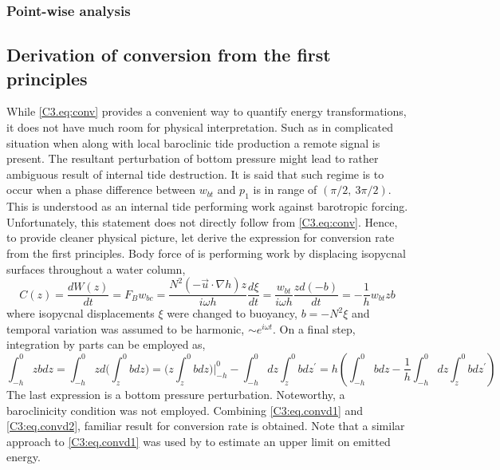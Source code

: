 \documentclass[12pt]{article}
\begin{document}
\subsubsection{Point-wise analysis}
\label{C3.app:A2}

\subsection{Derivation of conversion from the first principles}
\label{C3.app:B}
While \eqref{C3.eq:conv} provides a convenient way to quantify energy transformations, it does 
not have much room for physical interpretation. Such as in complicated situation when along with 
local baroclinic tide production a remote signal is present. The resultant perturbation of bottom 
pressure might lead to rather ambiguous result of internal tide destruction. It is said that such 
regime is to occur when a phase difference between $w_{bt}$ and $p_{1}$ is in range of 
$(\pi/2,~3\pi/2)$. This is understood as an internal tide performing work against barotropic 
forcing. Unfortunately, this statement does not directly follow from \eqref{C3.eq:conv}. Hence, to 
provide cleaner physical picture, let derive the expression for conversion rate from the first 
principles. Body force of \citep{baines1982internal} is performing work by displacing isopycnal 
surfaces 
throughout a water column,
\begin{equation}
\label{C3:eq.convd1}
C(z) = \frac{dW(z)}{dt} = F_{B} w_{bc} = \frac{N^2 (-\vec{u} \cdot \nabla h) z}{i \omega h} 
\frac{d 
\xi}{dt} = \frac{w_{bt}}{i \omega h} \frac{z d(-b)}{dt} = -\frac{1}{h} w_{bt} zb
\end{equation}
where isopycnal displacements $\xi$ were changed to buoyancy, $b = -N^2 \xi$ and temporal 
variation 
was assumed to be harmonic, $\sim e^{i \omega t}$. On a final step, integration by parts can be 
employed as,
\begin{equation}
\label{C3:eq.convd2}
\int_{-h}^{0} z b dz = \int_{-h}^{0} z d \big( \int^0_{z} b dz \big) = \big( z \int^0_{z} b dz 
\big)\big|_{-h}^0 - \int_{-h}^{0} dz \int_{z}^{0} b dz^{\prime} = h (\int_{-h}^{0}b dz - 
\frac{1}{h} \int_{-h}^{0} dz \int_{z}^{0} b dz^{\prime})
\end{equation}
The last expression is a bottom pressure perturbation. Noteworthy, a baroclinicity condition was 
not employed. Combining \eqref{C3:eq.convd1} and \eqref{C3:eq.convd2}, familiar result 
for conversion rate is obtained. Note that a similar approach to \eqref{C3:eq.convd1} was used 
by \citep{nash2006structure} to estimate an upper limit on emitted energy.\\
\end{document}
